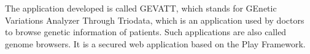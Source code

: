 The application developed is called GEVATT, which stands for GEnetic Variations Analyzer Through Triodata, which is an application used by doctors to browse genetic information of patients. Such applications are also called genome browsers. It is a secured web application based on the Play Framework.